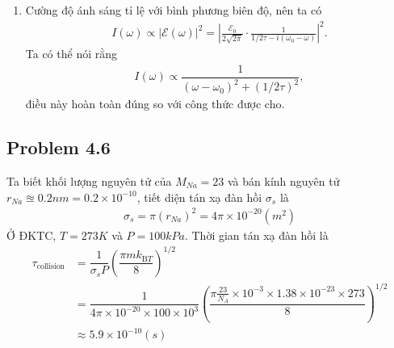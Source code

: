 \documentclass{article}
\newcommand{\f}[2]{\dfrac{#1}{#2}}
\begin{document}
\begin{enumerate}[label=(\alph*)]
	      \begin{align}
		      \mathcal{E}(\omega)
		       & = \f{1}{\sqrt{2}} \int_{0}^{+\infty} \left( \f{\mathcal{E}_0}{2} e^{i(\omega_0 - \omega)t - t/2\tau} + \f{\mathcal{E}_0}{2} e^{-i(\omega_0 + \omega)t - t/2\tau} \right) dt \nonumber \\
		       & = \frac{\mathcal{E}_0}{2\sqrt{2\pi}} \left( \frac{1}{1/2\tau - i(\omega_0 - \omega)} + \frac{1}{1/2\tau + i(\omega_0 + \omega)} \right).
	      \end{align}
	      Giả sử rằng $\omega_0 \gg 1/\tau$,
	      \begin{align*}
		      \mathcal{E}(\omega) \approx \frac{\mathcal{E}_0}{2\sqrt{2\pi}} \cdot \frac{1}{1/2\tau - i(\omega_0 - \omega)}.
	      \end{align*}(ĐPCM)
	\item  Cường độ ánh sáng tỉ lệ với bình phương biên độ, nên ta có
	      \begin{align}
		      I(\omega) \propto |\mathcal{E}(\omega)|^2 = \left|\frac{\mathcal{E}_0}{2\sqrt{2\pi}} \cdot \frac{1}{1/2\tau - i(\omega_0 - \omega)}\right|^2.
	      \end{align}
	      Ta có thể nói rằng
	      \begin{align}
		      I(\omega) \propto \f{1}{(\omega - \omega_0)^2 + (1/2\tau)^2},
	      \end{align}
	      điều này hoàn toàn đúng so với công thức được cho.
\end{enumerate}
\subsection*{Problem 4.6}
Ta biết khối lượng nguyên tử của $M_{Na} = 23$ và bán kính nguyên tử $r_{Na} \approxeq 0.2nm = 0.2\times 10^{-10}$, tiết diện tán xạ đàn hồi $\sigma_s$ là
\begin{align}
	\sigma_s = \pi (r_{Na})^2 = 4\pi \times 10^{-20} (m^2)
\end{align}
Ở ĐKTC, $T = 273 K$ và $P = 100k Pa$. Thời gian tán xạ đàn hồi là
\begin{align*}
	\tau_{\text{collision}}
	 & = \f{1}{\sigma_s P} \left( \f{\pi m k_{\text{B} T}}{8} \right)^{1/2}                                                                                       \\
	 & = \f{1}{4\pi \times 10^{-20 } \times 100\times10^{3}} \left( \f{\pi \frac{23}{N_A} \times 10^{-3} \times 1.38\times 10^{-23} \times 273 }{8} \right)^{1/2} \\
	 & \approx 5.9 \times 10^{-10} (s)
\end{align*}
\end{document}
